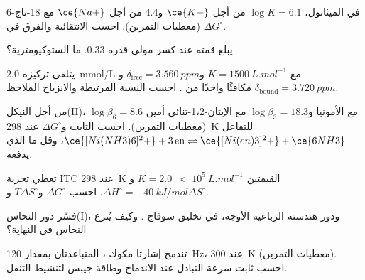 \begin{exercise}[$\star$]\label{exo:b3:supramolecular:3}
في الميثانول، $\log K = 6.1$ من أجل $\ce{K+}$ و4.4 من أجل $\ce{Na+}$ مع 18-تاج-6 (معطيات التمرين).
احسب الانتقائية والفرق في $\Delta G^\circ$.
\end{exercise}

\begin{exercise}[$\star$]\label{exo:b3:supramolecular:4}
يبلغ  قمته عند كسر مولي  قدره 0.33. ما الستوكيومترية؟
\end{exercise}

\begin{exercise}[$\star\star$]\label{exo:b3:supramolecular:5}
يتلقى  تركيزه \qty{2.0}{mmol/L} مع $K = \qty{1500}{L.mol^{-1}}$ و$\delta_{\mathrm{free}} = \qty{3.560}{ppm}$ و$\delta_{\mathrm{bound}} = \qty{3.720}{ppm}$ مكافئًا
واحدًا من . احسب النسبة المرتبطة والانزياح الملاحظ.
\end{exercise}

\begin{exercise}[$\star\star$]\label{exo:b3:supramolecular:6}
من أجل النيكل(II)، $\log\beta_6 = 8.6$ مع الأمونيا و$\log\beta_3 = 18.3$ مع الإيثان-1،2-ثنائي أمين (معطيات
التمرين). احسب الثابت و$\Delta G^\circ$ عند \qty{298}{K} للتفاعل
$\ce{[Ni(NH3)6]^2+} + 3\,\mathrm{en} \rightleftharpoons \ce{[Ni(en)3]^2+} + \ce{6NH3}$، وقل ما الذي يدفعه.
\end{exercise}

\begin{exercise}[$\star\star$]\label{exo:b3:supramolecular:7}
تعطي تجربة ITC عند \qty{298}{K} القيمتين $K = \qty{2.0e5}{L.mol^{-1}}$ و$\Delta H^\circ = \qty{-40}{kJ/mol}$. احسب $\Delta G^\circ$ و$T\Delta S^\circ$ 
و$\Delta S^\circ$.
\end{exercise}

\begin{exercise}[$\star\star$]\label{exo:b3:supramolecular:8}
فسّر دور النحاس(I)، ودور هندسته الرباعية الأوجه، في تخليق سوفاج
. وكيف يُنزع النحاس في النهاية؟
\end{exercise}

\begin{exercise}[$\star\star$]\label{exo:b3:supramolecular:9}
تندمج إشارتا مكوك ، المتباعدتان بمقدار \qty{120}{Hz}، عند \qty{300}{K} (معطيات
التمرين). احسب ثابت سرعة التبادل عند الاندماج وطاقة جيبس
لتنشيط التنقل.
\end{exercise}

